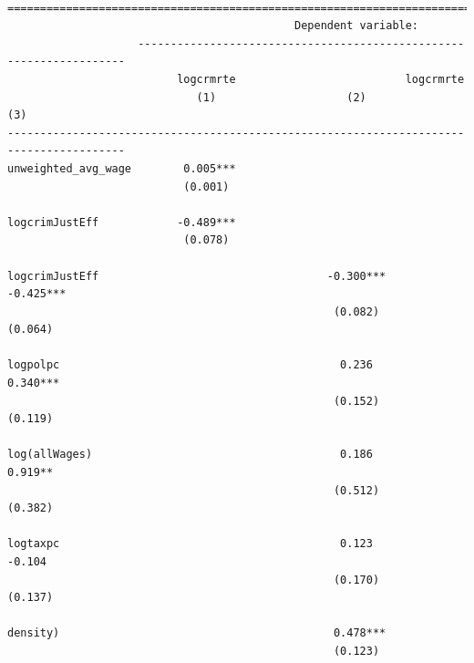 \documentclass[]{article}
\begin{document}
\begin{verbatim}

========================================================================================
                                            Dependent variable:                         
                    --------------------------------------------------------------------
                          logcrmrte                          logcrmrte                  
                             (1)                    (2)                    (3)          
----------------------------------------------------------------------------------------
unweighted_avg_wage        0.005***                                                     
                           (0.001)                                                      
                                                                                        
logcrimJustEff            -0.489***                                                     
                           (0.078)                                                      
                                                                                        
logcrimJustEff                                   -0.300***              -0.425***       
                                                  (0.082)                (0.064)        
                                                                                        
logpolpc                                           0.236                 0.340***       
                                                  (0.152)                (0.119)        
                                                                                        
log(allWages)                                      0.186                 0.919**        
                                                  (0.512)                (0.382)        
                                                                                        
logtaxpc                                           0.123                  -0.104        
                                                  (0.170)                (0.137)        
                                                                                        
density)                                          0.478***                              
                                                  (0.123)                               
                                                                                        

\end{verbatim}
\end{document}
